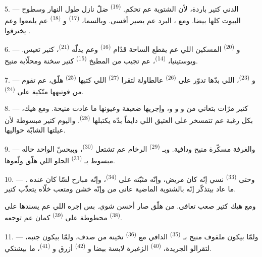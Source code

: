 5. --- الدني كتير باردة، لأن الشتوية عم تحكم. 
\textsuperscript{(19)} ضلّ نازل طول النهار وسطوح البيوت كلها بيضا. ومع
، البرد عم يصير أقسى. وبالسما، 
\textsuperscript{(17)} و \textsuperscript{(18)} عم يلمعوا
وعم يخترقوا .

\VUsaut{4.2mm}
\VUsaut{3.0mm}

6. --- و \textsuperscript{(20)} المسكين اللي عم يقطع
الساحة قدّام  \textsuperscript{(16)} وعم يدلّه
 \textsuperscript{(21)}، كتير تعيس. ويوستينيا،
 \textsuperscript{(14)}، عم تجيب من المطبخ
 \textsuperscript{(15)}  كتير سخنة ومحلّاية
منيح.

7. --- و \textsuperscript{(23)}، اللي بدّها تدوّر على
 \textsuperscript{(26)} عالطاولة لتقرا 
\textsuperscript{(27)} اللي كتبها  \textsuperscript{(25)}
هلّق، عم تقوم من فوتيهها متّكية على 
\textsuperscript{(24)}.

8. --- كتير مرّات بتعاني من  و
و و، وإجريها ضعيفة وعيونها ما عادت
منيحة. ومع هيك، بكل رغبة عم تتمسخر على  العتيق اللي
دايماً بدّه يكتبلها  \textsuperscript{(28)}. واليوم
كتير مبسوطة لأن عيلتها الشابّة حواليها.

9. --- والغرفة مسكّرة منيح ودافية. وبـ
\textsuperscript{(29)} الرخام عم تشتعل 
\textsuperscript{(30)}، وبيحسّ الواحد حاله مبسوط بـ
 \textsuperscript{(31)} الحلو اللي هلّق ولّعوها.

\VUsaut{4.2mm}
\VUsaut{3.0mm}

10. --- وحتى  \textsuperscript{(33)} نسي إنّه كان مريض،
وإنّه  مثبّته على 
\textsuperscript{(34)}، وإنّه مبارح لسّا كان عنده . ما عاد بيتذكّر إنّه بالشتوية الماضية عانى من  وإنّه  خشن ومتعب خلّاه يتعذّب كتير.

ومع هيك كتير صعب تعافى. من هلّق صار أحسن شوي. بس إجره اللي عم يسندها
على  \textsuperscript{(38)} محطوطة على 
\textsuperscript{(39)} كمان عم توجعه.

11. --- ولمّا بيكون ملفوف منيح بـ \textsuperscript{(35)}
الدافي مع  \textsuperscript{(36)} تخينة من صدف، ولمّا
بيكون جنبه، لتقرالو الجريدة،  \textsuperscript{(40)}
الزغيرة لابسة  بيضا و \textsuperscript{(42)}
أزرق و \textsuperscript{(41)}، ما بيشتكي.

